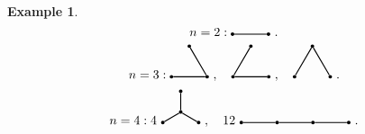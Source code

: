 \documentclass{report}
\theoremstyle{definition}
\newtheorem{example}{Example}[section]
\theoremstyle{remark}
\numberwithin{equation}{section}
\begin{document}
\begin{example}
    \[n = 2: \begin{tikzpicture}
        \node[shape=circle, fill=black, scale = 0.3] (A1) at (0, 0) {};
        \node[shape=circle, fill=black, scale = 0.3] (A2) at (1, 0) {};
        \draw[thick] (A1) to (A2);
    \end{tikzpicture}\ .\]
    \[n = 3: \begin{tikzpicture}
        \node[shape=circle, fill=black, scale = 0.3] (A1) at (0, 0) {};
        \node[shape=circle, fill=black, scale = 0.3] (A2) at (1, 0) {};
        \node[shape=circle, fill=black, scale = 0.3] (A3) at (0.5, {0.5*sqrt(3)}) {};
        \draw[thick] (A1) to (A2) to (A3);
    \end{tikzpicture}\ , \quad
    \begin{tikzpicture}
        \node[shape=circle, fill=black, scale = 0.3] (A1) at (0, 0) {};
        \node[shape=circle, fill=black, scale = 0.3] (A2) at (1, 0) {};
        \node[shape=circle, fill=black, scale = 0.3] (A3) at (0.5, {0.5*sqrt(3)}) {};
        \draw[thick] (A3) to (A1) to (A2);
    \end{tikzpicture}\ , \quad
    \begin{tikzpicture}
        \node[shape=circle, fill=black, scale = 0.3] (A1) at (0, 0) {};
        \node[shape=circle, fill=black, scale = 0.3] (A2) at (1, 0) {};
        \node[shape=circle, fill=black, scale = 0.3] (A3) at (0.5, {0.5*sqrt(3)}) {};
        \draw[thick] (A1) to (A3) to (A2);
    \end{tikzpicture}\ .\]
    \[n = 4: 4\ \begin{tikzpicture}
        \node[shape=circle, fill=black, scale = 0.3] (A1) at (0, 0) {};
        \node[shape=circle, fill=black, scale = 0.3] (A2) at (1, 0) {};
        \node[shape=circle, fill=black, scale = 0.3] (A3) at (0.5, {0.5*sqrt(3)}) {};
        \node[shape=circle, fill=black, scale = 0.3] (A4) at (0.5, {0.5/3*sqrt(3)}) {};
        \draw[thick] (A1) to (A4) to (A3);
        \draw[thick] (A2) to (A4);
    \end{tikzpicture}\ , \quad 12\ 
    \begin{tikzpicture}
        \node[shape=circle, fill=black, scale = 0.3] (A1) at (0, 0) {};
        \node[shape=circle, fill=black, scale = 0.3] (A2) at (1, 0) {};
        \node[shape=circle, fill=black, scale = 0.3] (A3) at (2, 0) {};
        \node[shape=circle, fill=black, scale = 0.3] (A4) at (3, 0) {};
        \draw[thick] (A1) to (A2) to (A3) to (A4);
    \end{tikzpicture}\ .\]

\end{example}
\end{document}
